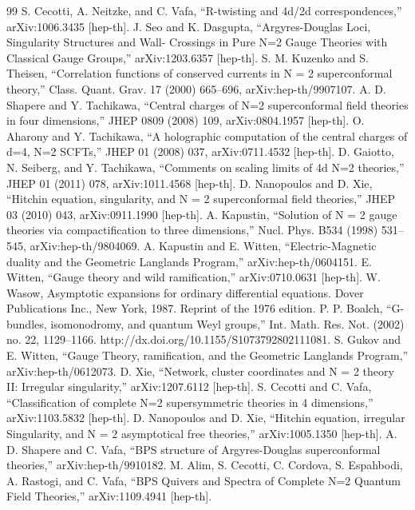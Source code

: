 \begin{thebibliography}{99}
 S. Cecotti, A. Neitzke, and C. Vafa, “R-twisting and 4d/2d correspondences,” arXiv:1006.3435 [hep-th].
 J. Seo and K. Dasgupta, “Argyres-Douglas Loci, Singularity Structures and Wall- Crossings in Pure N=2 Gauge Theories with Classical Gauge Groups,” arXiv:1203.6357 [hep-th].
 S. M. Kuzenko and S. Theisen, “Correlation functions of conserved currents in N = 2 superconformal theory,” Class. Quant. Grav. 17 (2000) 665–696, arXiv:hep-th/9907107.
 A. D. Shapere and Y. Tachikawa, “Central charges of N=2 superconformal ﬁeld theories in four dimensions,” JHEP 0809 (2008) 109, arXiv:0804.1957 [hep-th].
 O. Aharony and Y. Tachikawa, “A holographic computation of the central charges of d=4, N=2 SCFTs,” JHEP 01 (2008) 037, arXiv:0711.4532 [hep-th].
 D. Gaiotto, N. Seiberg, and Y. Tachikawa, “Comments on scaling limits of 4d N=2 theories,” JHEP 01 (2011) 078, arXiv:1011.4568 [hep-th].
 D. Nanopoulos and D. Xie, “Hitchin equation, singularity, and N = 2 superconformal ﬁeld theories,” JHEP 03 (2010) 043, arXiv:0911.1990 [hep-th].
 A. Kapustin, “Solution of N = 2 gauge theories via compactiﬁcation to three dimensions,” Nucl. Phys. B534 (1998) 531–545, arXiv:hep-th/9804069.
 A. Kapustin and E. Witten, “Electric-Magnetic duality and the Geometric Langlands Program,” arXiv:hep-th/0604151.
 E. Witten, “Gauge theory and wild ramiﬁcation,” arXiv:0710.0631 [hep-th].
 W. Wasow, Asymptotic expansions for ordinary diﬀerential equations. Dover Publications Inc., New York, 1987. Reprint of the 1976 edition.
 P. P. Boalch, “G-bundles, isomonodromy, and quantum Weyl groups,” Int. Math. Res. Not. (2002) no. 22, 1129–1166. http://dx.doi.org/10.1155/S1073792802111081.
 S. Gukov and E. Witten, “Gauge Theory, ramiﬁcation, and the Geometric Langlands Program,” arXiv:hep-th/0612073.
 D. Xie, “Network, cluster coordinates and N = 2 theory II: Irregular singularity,” arXiv:1207.6112 [hep-th].
 S. Cecotti and C. Vafa, “Classiﬁcation of complete N=2 supersymmetric theories in 4 dimensions,” arXiv:1103.5832 [hep-th].
 D. Nanopoulos and D. Xie, “Hitchin equation, irregular Singularity, and N = 2 asymptotical free theories,” arXiv:1005.1350 [hep-th].
 A. D. Shapere and C. Vafa, “BPS structure of Argyres-Douglas superconformal theories,” arXiv:hep-th/9910182.
 M. Alim, S. Cecotti, C. Cordova, S. Espahbodi, A. Rastogi, and C. Vafa, “BPS Quivers and Spectra of Complete N=2 Quantum Field Theories,” arXiv:1109.4941 [hep-th].

\end{thebibliography}
